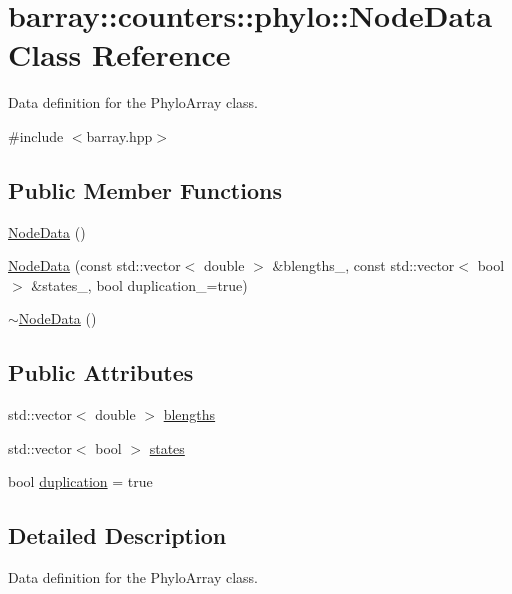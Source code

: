 \hypertarget{classbarray_1_1counters_1_1phylo_1_1_node_data}{}\section{barray\+:\+:counters\+:\+:phylo\+:\+:Node\+Data Class Reference}
\label{classbarray_1_1counters_1_1phylo_1_1_node_data}


Data definition for the {\ttfamily Phylo\+Array} class.  




{\ttfamily \#include $<$barray.\+hpp$>$}

\subsection*{Public Member Functions}
\begin{DoxyCompactItemize}
\item 
\hyperlink{classbarray_1_1counters_1_1phylo_1_1_node_data_a6c7c4ec30af2f9709fcc0b812c6f7202}{Node\+Data} ()
\item 
\hyperlink{classbarray_1_1counters_1_1phylo_1_1_node_data_adc8f549876bd90eff47537aa5bf8d65e}{Node\+Data} (const std\+::vector$<$ double $>$ \&blengths\+\_\+, const std\+::vector$<$ bool $>$ \&states\+\_\+, bool duplication\+\_\+=true)
\item 
\hyperlink{classbarray_1_1counters_1_1phylo_1_1_node_data_a9bda1df5baebe891dd0d9ed79f75ecfb}{$\sim$\+Node\+Data} ()
\end{DoxyCompactItemize}
\subsection*{Public Attributes}
\begin{DoxyCompactItemize}
\item 
std\+::vector$<$ double $>$ \hyperlink{classbarray_1_1counters_1_1phylo_1_1_node_data_a346755063d311c434bb7e21871002ebb}{blengths}
\item 
std\+::vector$<$ bool $>$ \hyperlink{classbarray_1_1counters_1_1phylo_1_1_node_data_a2f22473266c1ef55e66bab1288d9efd3}{states}
\item 
bool \hyperlink{classbarray_1_1counters_1_1phylo_1_1_node_data_a098239ba4bd5fc62c304cf987956ac7f}{duplication} = true
\end{DoxyCompactItemize}


\subsection{Detailed Description}
Data definition for the {\ttfamily Phylo\+Array} class. 

